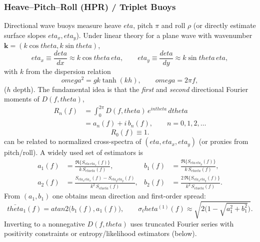 \documentclass[journal,10pt,twocolumn]{IEEEtran}
\def\omega{omega}%
\def\eta{eta}%
\def\theta{theta}%
\def\partial{d}%
\def\mathrm#1{#1}%
\begin{document}
    \subsubsection{Heave--Pitch--Roll (HPR) / Triplet Buoys}
    Directional wave buoys measure heave $\eta$, pitch $\pi$ and roll $\rho$ (or directly estimate surface slopes $\eta_x,\eta_y$). Under linear theory for a plane wave with wavenumber $\mathbf{k}=(k\cos\theta,k\sin\theta)$,
    \begin{equation}
        \eta_x \equiv \frac{\partial\eta}{\partial x} \approx k\cos\theta\,\eta,
        \qquad
        \eta_y \equiv \frac{\partial\eta}{\partial y} \approx k\sin\theta\,\eta,
    \end{equation}
    with $k$ from the dispersion relation
    \begin{equation}
        \omega^2 = gk\tanh(kh), \qquad \omega=2\pi f,
        \label{eq:dispersion_dir}
    \end{equation}
    ($h$ depth). The fundamental idea is that the \emph{first} and \emph{second} directional Fourier moments of $D(f,\theta)$,
	\begin{equation}
	\begin{aligned}
	R_n(f)
	&= \int_{0}^{2\pi} D(f,\theta)\, e^{\mathrm{i}n\theta}\, d\theta \\
	&= a_n(f) + \mathrm{i}\,b_n(f),
	\qquad n=0,1,2,\ldots
	\end{aligned}
	\end{equation}
	\begin{equation}
	R_0(f) \equiv 1.
	\end{equation}
    can be related to normalized cross-spectra of $(\eta,\eta_x,\eta_y)$ (or proxies from pitch/roll). A widely used set of estimators is
    \begin{align}
        a_1(f) &= \frac{\Re\{ S_{\eta\,\eta_x}(f)\}}{k\,S_{\eta\eta}(f)},
        &
        b_1(f) &= \frac{\Re\{ S_{\eta\,\eta_y}(f)\}}{k\,S_{\eta\eta}(f)},\\
        a_2(f) &= \frac{S_{\eta_x\eta_x}(f) - S_{\eta_y\eta_y}(f)}{k^2\,S_{\eta\eta}(f)},
        &
        b_2(f) &= \frac{2\,\Re\{ S_{\eta_x\eta_y}(f)\}}{k^2\,S_{\eta\eta}(f)}.
        \label{eq:a1b1a2b2}
    \end{align}
    From $(a_1,b_1)$ one obtains mean direction and first-order spread:
    \begin{equation}
        \bar{\theta}_1(f) = \mathrm{atan2}\!\big(b_1(f),a_1(f)\big),
        \qquad
        \sigma_\theta^{(1)}(f) \approx \sqrt{2\big(1-\sqrt{a_1^2+b_1^2}\big)}.
    \end{equation}
    Inverting to a nonnegative $D(f,\theta)$ uses truncated Fourier series with positivity constraints or entropy/likelihood estimators (below).
\end{document}
